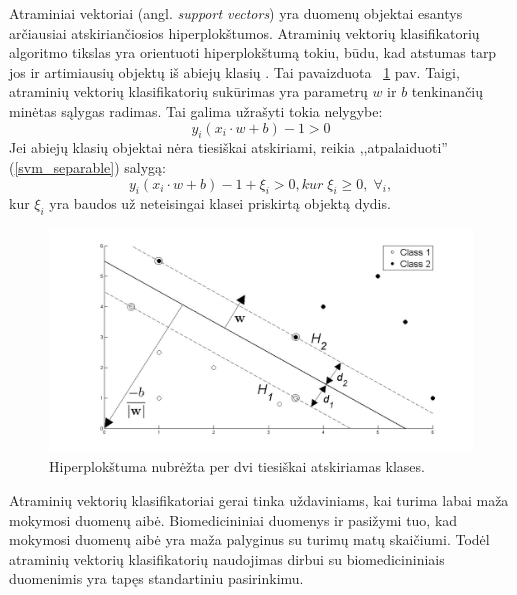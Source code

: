 Atraminiai vektoriai (angl. \textit{support vectors}) yra duomenų objektai esantys arčiausiai atskiriančiosios hiperplokštumos. Atraminių vektorių klasifikatorių algoritmo tikslas yra orientuoti hiperplokštumą tokiu, būdu, kad atstumas tarp jos ir artimiausių objektų iš abiejų klasių \cite{cortes1995support}. Tai pavaizduota ~\ref{fig:support_vector_machines} pav. Taigi, atraminių vektorių klasifikatorių sukūrimas yra parametrų $w$ ir $b$ tenkinančių minėtas sąlygas radimas. Tai galima užrašyti tokia nelygybe:
\begin{equation}
 \label{svm_separable}
 y_i(x_i \cdot w + b) - 1 > 0
\end{equation}
Jei abiejų klasių objektai nėra tiesiškai atskiriami, reikia ,,atpalaiduoti'' (\ref{svm_separable}) salygą:
\begin{equation}
 \label{svm_non_separable}
 y_i(x_i \cdot w + b) - 1 + \xi_i > 0, kur\; \xi_i \geq 0, \;  \forall_i,
\end{equation}
kur $\xi_i$ yra baudos už neteisingai klasei priskirtą objektą dydis.
\begin{figure}
 \centering
 \includegraphics[width=.7\textwidth]{images/support_vector_machines.jpg}
 \caption{Hiperplokštuma nubrėžta per dvi tiesiškai atskiriamas klases.}
 \label{fig:support_vector_machines}
\end{figure}

Atraminių vektorių klasifikatoriai gerai tinka uždaviniams, kai turima labai maža mokymosi duomenų aibė. Biomedicininiai duomenys ir pasižymi tuo, kad mokymosi duomenų aibė yra maža palyginus su turimų matų skaičiumi. Todėl atraminių vektorių klasifikatorių naudojimas dirbui su biomedicininiais duomenimis yra tapęs standartiniu pasirinkimu. 





